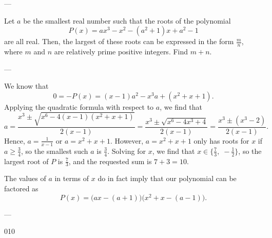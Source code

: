 
---

Let $a$ be the smallest real number such that the roots of the polynomial \[P(x)=ax^3-x^2-(a^2+1)x+a^2-1\]
are all real. Then, the largest of these roots can be expressed in the form $\tfrac mn$, where $m$ and $n$ are relatively prime positive integers. Find $m+n$.

---

We know that \[0=-P(x)=(x-1)a^2-x^3a+(x^2+x+1).\]
Applying the quadratic formula with respect to $a$, we find that \[a=\frac{x^3\pm\sqrt{x^6-4(x-1)(x^2+x+1)}}{2(x-1)}=\frac{x^3\pm\sqrt{x^6-4x^3+4}}{2(x-1)}=\frac{x^3\pm(x^3-2)}{2(x-1)}.\]
Hence, $a=\frac1{x-1}$ or $a=x^2+x+1$. However, $a=x^2+x+1$ only has roots for $x$ if $a\ge\tfrac34$, so the smallest such $a$ is $\tfrac34$. Solving for $x$, we find that $x\in\{\frac73,\;-\frac12\}$, so the largest root of $P$ is $\tfrac73$, and the requested sum is $7+3=10$.
\begin{boxremark}
    The values of $a$ in terms of $x$ do in fact imply that our polynomial can be factored as \[P(x)=\big(ax-(a+1)\big)\big(x^2+x-(a-1)\big).\]
\end{boxremark}

---

010
